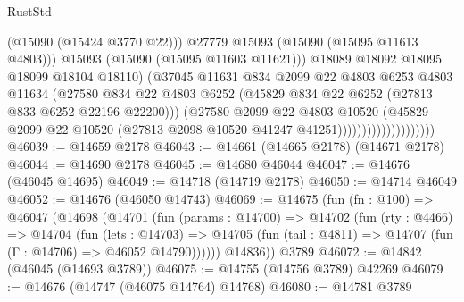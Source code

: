 \begin{lexlean}{RustStd}
\begin{coremodule}
                                            (@15090 (@15424 @3770 @22)))
                                          @27779
                                          @15093
                                          (@15090 (@15095 @11613 @4803)))
                                        @15093
                                        (@15090 (@15095 @11603 @11621)))
                                      @18089
                                      @18092
                                      @18095
                                      @18099
                                      @18104
                                      @18110)
                                    (@37045
                                      @11631
                                      @834
                                      @2099
                                      @22
                                      @4803
                                      @6253
                                      @4803
                                      @11634
                                      (@27580
                                        @834
                                        @22
                                        @4803
                                        @6252
                                        (@45829 @834 @22 @6252 (@27813 @833 @6252 @22196 @22200)))
                                      (@27580
                                        @2099
                                        @22
                                        @4803
                                        @10520
                                        (@45829
                                          @2099
                                          @22
                                          @10520
                                          (@27813 @2098 @10520 @41247 @41251))))))))))))))))))))
@46039 := @14659 @2178
@46043 := @14661 (@14665 @2178) (@14671 @2178)
@46044 := @14690 @2178
@46045 := @14680 @46044
@46047 := @14676 (@46045 @14695)
@46049 := @14718 (@14719 @2178)
@46050 := @14714 @46049
@46052 := @14676 (@46050 @14743)
@46069 := @14675
    (fun (fn : @100) =>
    @46047
      (@14698
        (@14701
          (fun (params : @14700) =>
          @14702
            (fun (rty : @4466) =>
            @14704
              (fun (lets : @14703) =>
              @14705 (fun (tail : @4811) => @14707 (fun (Γ : @14706) => @46052 @14790))))))
        @14836))
    @3789
@46072 := @14842 (@46045 (@14693 @3789))
@46075 := @14755 (@14756 @3789) @42269
@46079 := @14676 (@14747 (@46075 @14764) @14768)
@46080 := @14781 @3789

\end{coremodule}
\end{lexlean}
